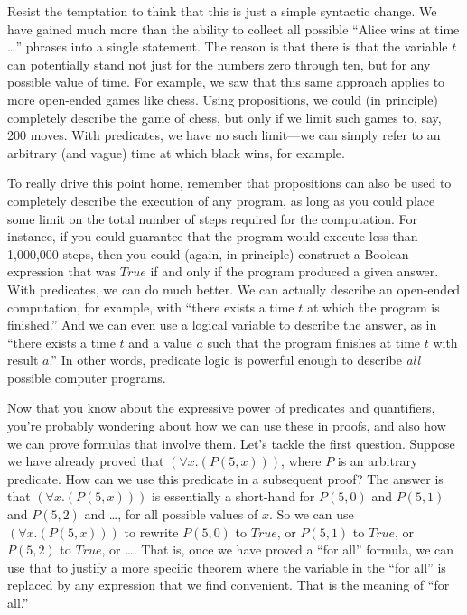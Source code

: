 Resist the temptation to think that this is just a simple syntactic change. We have gained much more than the ability to
collect all possible ``Alice wins at time \dots'' phrases into a single statement. The reason is that there is that
the variable $t$ can potentially stand not just for the numbers zero through ten, but for any possible value of time. For example,
we saw that this same approach applies to more open-ended games like chess. Using propositions, we could (in principle)
completely describe the game of chess, but only if we limit such games to, say, 200 moves. With predicates, we have no such
limit---we can simply refer to an arbitrary (and vague) time at which black wins, for example.

To really drive this point home, remember that propositions can also be used to completely describe the execution of any
program, as long as you could place some limit on the total number of steps required for the computation. For instance, if
you could guarantee that the program would execute less than 1,000,000 steps, then you could (again, in principle) construct
a Boolean expression that was $True$ if and only if the program produced a given answer. With predicates, we can do much better.
We can actually describe an open-ended computation, for example, with ``there exists a time $t$ at which the program is finished.'' And
we can even use a logical variable to describe the answer, as in ``there exists a time $t$ and a value $a$ such that the program 
finishes at time $t$ with result $a$.'' In other words, predicate logic is powerful enough to describe \emph{all} possible
computer programs.

Now that you know about the expressive power of predicates and quantifiers, you're probably wondering about how we
can use these in proofs, and also how we can prove formulas that involve them. Let's tackle the first question. Suppose
we have already proved that $(\forall x.(P(5, x)))$, where $P$ is an arbitrary predicate. How can we use this predicate
in a subsequent proof? The answer is that $(\forall x.(P(5, x)))$ is essentially a short-hand for $P(5, 0)$
and $P(5, 1)$ and $P(5, 2)$ and \dots, for all possible values of $x$. So we can use $(\forall x.(P(5, x)))$ to rewrite
$P(5, 0)$ to $True$, or $P(5, 1)$ to $True$, or $P(5, 2)$ to $True$, or \dots. That is, once we have proved a ``for all'' 
formula, we can use that to justify a more specific theorem where the variable in the ``for all'' is replaced by any
expression that we find convenient. That is the meaning of ``for all.''

